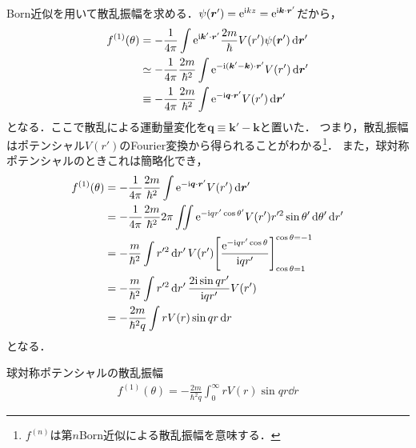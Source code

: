 \documentclass{report}
\begin{document}
 Born近似を用いて散乱振幅を求める．$\psi(\bm{r}') = \mathrm{e}^{\mathrm{i} kz} = \mathrm{e}^{\mathrm{i} \bm{k}\cdot\bm{r}'}$だから，
 \begin{align}
  f^{(1)}(\theta) &= -\frac{1}{4\pi} \int \mathrm{e}^{\mathrm{i} \bm{k}' \cdot \bm{r}'} \frac{2m}{\hbar} V(r') \psi(\bm{r}') \dd{\bm{r}'}\\
  & \simeq -\frac{1}{4\pi}\frac{2m}{\hbar^2}\int\mathrm{e}^{-\mathrm{i} (\bm{k}' - \bm{k})\cdot \bm{r}'} V(r') \dd{\bm{r}'}\\
  & \equiv -\frac{1}{4\pi}\frac{2m}{\hbar^2}\int\mathrm{e}^{-\mathrm{i} \bm{q}\cdot \bm{r}'} V(r') \dd{\bm{r}'}
 \end{align}
 となる．ここで散乱による運動量変化を$\bm{q}\equiv \bm{k}' - \bm{k}$と置いた．
 つまり，散乱振幅はポテンシャル$V(r')$のFourier変換から得られることがわかる\footnote{$f^{(n)}$は第$n$Born近似による散乱振幅を意味する．}．
 また，球対称ポテンシャルのときこれは簡略化でき，
 \begin{align}
  f^{(1)}(\theta) &= -\frac{1}{4\pi}\frac{2m}{\hbar^2}\int\mathrm{e}^{-\mathrm{i} \bm{q}\cdot \bm{r}'} V(r') \dd{\bm{r}'}\\
  &= -\frac{1}{4\pi}\frac{2m}{\hbar^2} 2\pi \iint \mathrm{e}^{-\mathrm{i} qr' \cos\theta'} V(r') r'^2 \sin\theta' \dd{\theta'} \dd{r'}\\
  &= -\frac{m}{\hbar^2} \int r'^2 \dd{r'} V(r') \qty[\frac{\mathrm{e}^{-\mathrm{i} qr' \cos\theta}}{\mathrm{i} qr'}]^{\cos\theta = -1}_{\cos\theta =1}\\
  &= -\frac{m}{\hbar^2} \int r'^2 \dd{r'} \frac{2\mathrm{i} \sin qr'}{\mathrm{i} qr'}V(r')\\
  &= -\frac{2m}{\hbar^2 q} \int rV(r)\sin qr \dd{r}
 \end{align}
 となる．
 \begin{itembox}[l]{球対称ポテンシャルの散乱振幅}
  \begin{align}
    \label{SCamp1st}
    f^{(1)}(\theta) =  -\frac{2m}{\hbar^2 q} \int_{0}^{\infty} rV(r)\sin qr \dd{r}
  \end{align}
 \end{itembox} 
\end{document}
